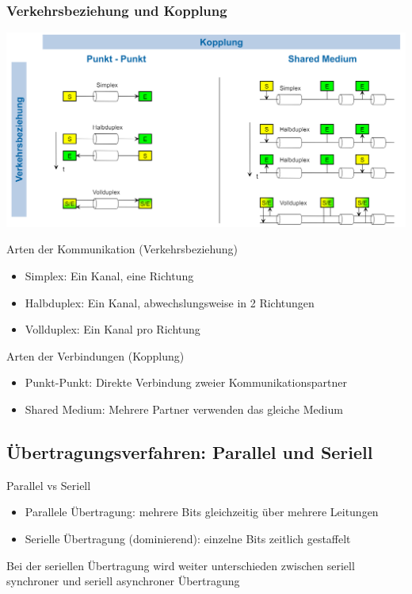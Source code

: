 \subsubsection{Verkehrsbeziehung und Kopplung}
\includegraphics[width=1\linewidth]{images/Verkehrsbeziehung_Kopplung.png}
\begin{concept}{Arten der Kommunikation (Verkehrsbeziehung)}
    \begin{itemize}
        \item Simplex: Ein Kanal, eine Richtung
        \item Halbduplex: Ein Kanal, abwechslungsweise in 2 Richtungen
        \item Vollduplex: Ein Kanal pro Richtung
    \end{itemize}
\end{concept}

\begin{concept}{Arten der Verbindungen (Kopplung)}
    \begin{itemize}
        \item Punkt-Punkt: Direkte Verbindung zweier Kommunikationspartner
        \item Shared Medium: Mehrere Partner verwenden das gleiche Medium
    \end{itemize}
\end{concept}

\subsection{Übertragungsverfahren: Parallel und Seriell}

\begin{definition}{Parallel vs Seriell}
    \begin{itemize}
        \item Parallele Übertragung: mehrere Bits gleichzeitig über mehrere Leitungen
        \item Serielle Übertragung (dominierend): einzelne Bits zeitlich gestaffelt
    \end{itemize}
    Bei der seriellen Übertragung wird weiter unterschieden zwischen seriell synchroner und
    seriell asynchroner Übertragung
\end{definition}

